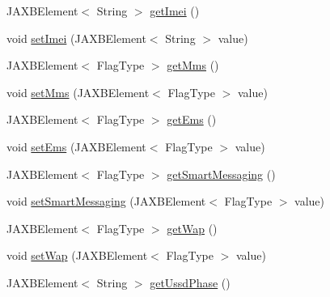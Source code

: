 \begin{DoxyCompactItemize}
\item 
JAXBElement$<$ String $>$ \hyperlink{classcom_1_1telefonica_1_1schemas_1_1unica_1_1rest_1_1directory_1_1v1_1_1UserTerminalInfoType_a537d6826ae42305486ef4130f4696403}{getImei} ()
\item 
void \hyperlink{classcom_1_1telefonica_1_1schemas_1_1unica_1_1rest_1_1directory_1_1v1_1_1UserTerminalInfoType_a9ed2dfa55f3d838f5127e2e631fbb420}{setImei} (JAXBElement$<$ String $>$ value)
\item 
JAXBElement$<$ FlagType $>$ \hyperlink{classcom_1_1telefonica_1_1schemas_1_1unica_1_1rest_1_1directory_1_1v1_1_1UserTerminalInfoType_ad6d18d65544538c949f7218a3efe98e2}{getMms} ()
\item 
void \hyperlink{classcom_1_1telefonica_1_1schemas_1_1unica_1_1rest_1_1directory_1_1v1_1_1UserTerminalInfoType_ab976af54a6295438972557132ece49f4}{setMms} (JAXBElement$<$ FlagType $>$ value)
\item 
JAXBElement$<$ FlagType $>$ \hyperlink{classcom_1_1telefonica_1_1schemas_1_1unica_1_1rest_1_1directory_1_1v1_1_1UserTerminalInfoType_a9291865b8ed6d86046b6e828f9b3438f}{getEms} ()
\item 
void \hyperlink{classcom_1_1telefonica_1_1schemas_1_1unica_1_1rest_1_1directory_1_1v1_1_1UserTerminalInfoType_a3eb65a58a0ec9ecbae156f90e337bdc5}{setEms} (JAXBElement$<$ FlagType $>$ value)
\item 
JAXBElement$<$ FlagType $>$ \hyperlink{classcom_1_1telefonica_1_1schemas_1_1unica_1_1rest_1_1directory_1_1v1_1_1UserTerminalInfoType_a78ec2687c5a2e410f1d921b3b153a3ea}{getSmartMessaging} ()
\item 
void \hyperlink{classcom_1_1telefonica_1_1schemas_1_1unica_1_1rest_1_1directory_1_1v1_1_1UserTerminalInfoType_a9bc9f61066e919e38149013a0a192d7a}{setSmartMessaging} (JAXBElement$<$ FlagType $>$ value)
\item 
JAXBElement$<$ FlagType $>$ \hyperlink{classcom_1_1telefonica_1_1schemas_1_1unica_1_1rest_1_1directory_1_1v1_1_1UserTerminalInfoType_a0010cbfd1c887097e39557230be3396e}{getWap} ()
\item 
void \hyperlink{classcom_1_1telefonica_1_1schemas_1_1unica_1_1rest_1_1directory_1_1v1_1_1UserTerminalInfoType_ab9c8c05ec4f01fc1a1028b1f014d5cc5}{setWap} (JAXBElement$<$ FlagType $>$ value)
\item 
JAXBElement$<$ String $>$ \hyperlink{classcom_1_1telefonica_1_1schemas_1_1unica_1_1rest_1_1directory_1_1v1_1_1UserTerminalInfoType_aa031e864b513802ac7b68bb53a070327}{getUssdPhase} ()
\item 

\end{DoxyCompactItemize}
